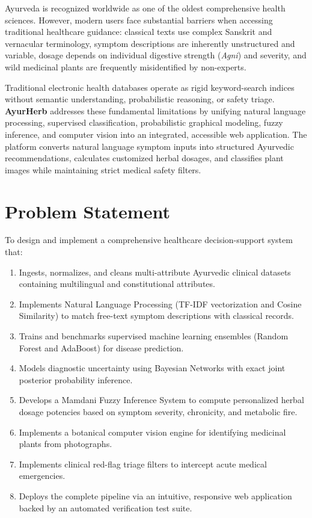 \documentclass[12pt,a4paper]{article}
\begin{document}
Ayurveda is recognized worldwide as one of the oldest comprehensive health sciences. However, modern users face substantial barriers when accessing traditional healthcare guidance: classical texts use complex Sanskrit and vernacular terminology, symptom descriptions are inherently unstructured and variable, dosage depends on individual digestive strength (\textit{Agni}) and severity, and wild medicinal plants are frequently misidentified by non-experts.

Traditional electronic health databases operate as rigid keyword-search indices without semantic understanding, probabilistic reasoning, or safety triage. \textbf{AyurHerb} addresses these fundamental limitations by unifying natural language processing, supervised classification, probabilistic graphical modeling, fuzzy inference, and computer vision into an integrated, accessible web application. The platform converts natural language symptom inputs into structured Ayurvedic recommendations, calculates customized herbal dosages, and classifies plant images while maintaining strict medical safety filters.

\section{Problem Statement}

To design and implement a comprehensive healthcare decision-support system that:
\begin{enumerate}
    \item Ingests, normalizes, and cleans multi-attribute Ayurvedic clinical datasets containing multilingual and constitutional attributes.
    \item Implements Natural Language Processing (TF-IDF vectorization and Cosine Similarity) to match free-text symptom descriptions with classical records.
    \item Trains and benchmarks supervised machine learning ensembles (Random Forest and AdaBoost) for disease prediction.
    \item Models diagnostic uncertainty using Bayesian Networks with exact joint posterior probability inference.
    \item Develops a Mamdani Fuzzy Inference System to compute personalized herbal dosage potencies based on symptom severity, chronicity, and metabolic fire.
    \item Implements a botanical computer vision engine for identifying medicinal plants from photographs.
    \item Implements clinical red-flag triage filters to intercept acute medical emergencies.
    \item Deploys the complete pipeline via an intuitive, responsive web application backed by an automated verification test suite.
\end{enumerate}
\end{document}
